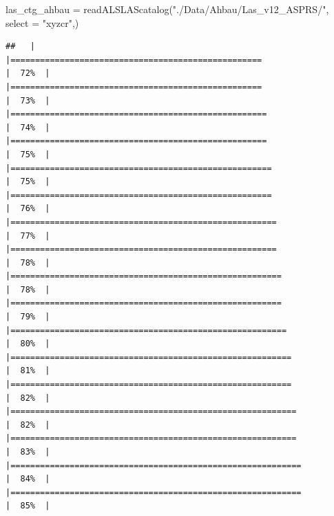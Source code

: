 \documentclass[
]{article}
\newenvironment{Shaded}{\begin{snugshade}}{\end{snugshade}}
\newcommand{\AttributeTok}[1]{\textcolor[rgb]{0.77,0.63,0.00}{#1}}
\newcommand{\FunctionTok}[1]{\textcolor[rgb]{0.00,0.00,0.00}{#1}}
\newcommand{\NormalTok}[1]{#1}
\newcommand{\OtherTok}[1]{\textcolor[rgb]{0.56,0.35,0.01}{#1}}
\newcommand{\StringTok}[1]{\textcolor[rgb]{0.31,0.60,0.02}{#1}}
\begin{document}
\begin{Shaded}
\begin{Highlighting}[]
\NormalTok{las\_ctg\_ahbau }\OtherTok{=} \FunctionTok{readALSLAScatalog}\NormalTok{(}\StringTok{"./Data/Ahbau/Las\_v12\_ASPRS/"}\NormalTok{, }\AttributeTok{select =} \StringTok{"xyzcr"}\NormalTok{,)}
\end{Highlighting}
\end{Shaded}

\begin{verbatim}
##   |                                                                              |===================================================                   |  72%  |                                                                              |===================================================                   |  73%  |                                                                              |====================================================                  |  74%  |                                                                              |====================================================                  |  75%  |                                                                              |=====================================================                 |  75%  |                                                                              |=====================================================                 |  76%  |                                                                              |======================================================                |  77%  |                                                                              |======================================================                |  78%  |                                                                              |=======================================================               |  78%  |                                                                              |=======================================================               |  79%  |                                                                              |========================================================              |  80%  |                                                                              |=========================================================             |  81%  |                                                                              |=========================================================             |  82%  |                                                                              |==========================================================            |  82%  |                                                                              |==========================================================            |  83%  |                                                                              |===========================================================           |  84%  |                                                                              |===========================================================           |  85%  |                                                                              
\end{verbatim}
\end{document}
